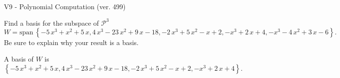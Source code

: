 \begin{exercise}
  \begin{exerciseTitle}V9 - Polynomial Computation (ver. 499)\end{exerciseTitle}
  \begin{exerciseStatement}
    Find a basis for the subspace of \(\mathcal{P}^3\) 
\[W=\mathrm{span}\ \left\{-5 \, x^{3} + x^{2} + 5 \, x , 4 \, x^{3} - 23 \, x^{2} + 9 \, x - 18 , -2 \, x^{3} + 5 \, x^{2} - x + 2 , -x^{3} + 2 \, x + 4 , -x^{3} - 4 \, x^{2} + 3 \, x - 6\right\}.\]
 Be sure to explain why your result is a basis.


  \end{exerciseStatement}
  \begin{exerciseAnswer}
   A basis of \(W\) is  \(\left\{-5 \, x^{3} + x^{2} + 5 \, x , 4 \, x^{3} - 23 \, x^{2} + 9 \, x - 18 , -2 \, x^{3} + 5 \, x^{2} - x + 2 , -x^{3} + 2 \, x + 4\right\}\).
  


  \end{exerciseAnswer}
\end{exercise}